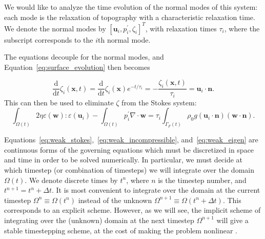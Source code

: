 \documentclass[preprint,12pt,authoryear]{elsarticle}
\begin{document}
We would like to analyze the time evolution of the normal modes of this system: each mode 
is the relaxation of topography with a characteristic relaxation time.  
We denote the normal modes by $\left[ \mathbf{u}_i, p^\prime_i, \zeta_i \right]^T$, with
relaxation times $\tau_i$, where the subscript corresponds to the $i$th normal mode.

The equations decouple for the normal modes, and Equation~\eqref{eq:surface_evolution} then becomes

\begin{equation}
\frac {\text{d}}{\text{d} t} \zeta_i(\mathbf{x},t) = \frac{\text{d}}{\text{d}t} \zeta_i(\mathbf{x})e^{-t/\tau_i} = -\frac{\zeta_i(\mathbf{x},t)}{\tau_i} = \mathbf{u}_i \cdot \mathbf{n}.
\end{equation}
This can then be used to eliminate $\zeta$ from the Stokes system:
\begin{equation}
\int_{\Omega(t)} 2 \eta \varepsilon( \mathbf{w} ) \colon \varepsilon( \mathbf{u}_i ) - \int_{\Omega(t)} p^\prime_i \nabla \cdot \mathbf{w} 
= \tau_i \int_{\Gamma_F(t)} \rho_0 g (\mathbf{u}_i \cdot \mathbf{n} ) (\mathbf{w} \cdot \mathbf{n}).
\label{eq:weak_eigen}
\end{equation}

Equations~\eqref{eq:weak_stokes},~\eqref{eq:weak_incompressible}, and~\eqref{eq:weak_eigen}
are continuous forms of the governing equations which must be discretized in space and time in order to be solved numerically.
In particular, we must decide at which timestep (or combination of timesteps) we will integrate over the domain $\Omega(t)$.
We denote discrete times by $t^n$, where $n$ is the timestep number, and $t^{n+1} = t^n+\Delta t$.
It is most convenient to integrate over the domain at the current timestep $\Omega^n \equiv \Omega(t^n)$ instead of 
the unknown $\Omega^{n+1} \equiv \Omega(t^{n}+\Delta t)$. This corresponds to an explicit scheme.
However, as we will see, the implicit scheme of integrating over the (unknown) domain at the next timestep $\Omega^{n+1}$ will
give a stable timestepping scheme, at the cost of making the problem nonlinear \citep{furuichi2015implicit}.
\end{document}
